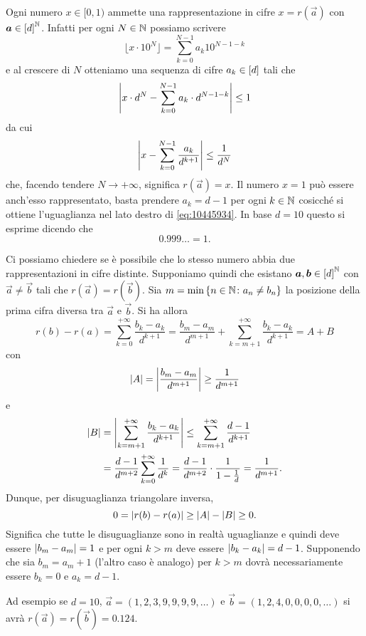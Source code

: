 Ogni numero $x\in [0,1)$ ammette una rappresentazione in cifre $x=r(\vec a)$ 
con $\boldsymbol a \in {\left[ d \right]}^{\mathbb N}$. 
Infatti per ogni $N\in {\mathbb N}$ possiamo scrivere 
\[
  \lfloor x\cdot 10^N \rfloor= \sum_{k=0}^{N-1} a_k 10^{N-1-k}
\]
e al crescere di $N$ otteniamo una sequenza di cifre $a_k\in {\left[ d \right]}$ 
tali che 
\[
  {\left|x \cdot d^N - \sum_{k=0}^{N-1} a_k \cdot d^{N-1-k}\right|} \le 1
\]
da cui 
\[
  {\left|x - \sum_{k=0}^{N-1} \frac{a_k}{d^{k+1}}\right|} \le \frac{1}{d^{N}}
\]
che, facendo tendere $N\to +\infty$, significa $r(\vec a) = x$.
Il numero $x=1$ può essere anch'esso rappresentato, basta prendere 
$a_k=d-1$ per ogni $k\in {\mathbb N}$ cosicché si ottiene l'uguaglianza 
nel lato destro di \eqref{eq:10445934}. 
In base $d=10$ questo si esprime dicendo che 
\[
 0.999\ldots = 1.  
\]

Ci possiamo chiedere se è possibile che lo stesso numero 
abbia due rappresentazioni in cifre distinte.
Supponiamo quindi che esistano $\boldsymbol a,\boldsymbol b\in {\left[ d \right]}^{\mathbb N}$
con $\vec a \neq \vec b$ 
tali che $r(\vec a) = r(\vec b)$. 
Sia $m = \min{\left\{ n\in{\mathbb N}\colon a_n\neq b_n \right\}}$ la posizione 
della prima cifra diversa tra $\vec a$ e $\vec b$.
Si ha allora 
\[
 r(b) - r(a) = \sum_{k=0}^{+\infty}\frac{b_k - a_k}{d^{k+1}}
 = \frac{b_m - a_m}{d^{m+1}} + \sum_{k=m+1}^{+\infty} \frac{b_k - a_k}{d^{k+1}}
 = A+B
\]
con 
\[
{\left|A\right|} = {\left|\frac{b_m - a_m}{d^{m+1}}\right|} \ge \frac{1}{d^{m+1}}  
\]
e 
\begin{align*}
{\left|B\right|} &= {\left|\sum_{k=m+1}^{+\infty} \frac{b_k - a_k}{d^{k+1}}\right|}
        \le \sum_{k=m+1}^{+\infty} \frac{d-1}{d^{k+1}}\\
        &= \frac{d-1}{d^{m+2}}\sum_{k=0}^{+\infty}\frac{1}{d^k}
        = \frac{d-1}{d^{m+2}}\cdot \frac{1}{1-\frac 1 d} = \frac{1}{d^{m+1}}.
\end{align*}
Dunque, per disuguaglianza triangolare inversa,
\[
0 = {\left|r(b)-r(a)\right|}\ge {\left|A\right|} - {\left|B\right|} \ge 0.  
\]
Significa che tutte le disuguaglianze sono in realtà uguaglianze
e quindi deve essere ${\left|b_m-a_m\right|}=1$ 
e per ogni $k>m$ deve essere ${\left|b_k-a_k\right|}=d-1$. 
Supponendo che sia $b_m=a_m+1$ (l'altro caso è analogo)
per $k>m$ dovrà necessariamente essere $b_k=0$ e $a_k=d-1$.

Ad esempio se $d=10$, $\vec a = (1,2,3,9,9,9,9,\dots )$ 
e $\vec b = (1,2,4,0,0,0,0,\dots)$ si avrà 
$r(\vec a) = r(\vec b) = 0.124$.

